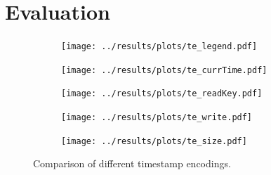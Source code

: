 \documentclass[border=2cm]{standalone}
\begin{document}
\begin{minipage}{17cm}

  \setcounter{section}{4}
  \setcounter{figure}{5}
  \setcounter{lstlisting}{2}

  \section{Evaluation}

  \begin{figure}[t]
    \centering
    \begin{subfigure}{0.5\textwidth}
      \centering
      \hspace*{0.7cm}
      \texttt{[image: ../results/plots/te\_legend.pdf]}
    \end{subfigure}

    \medskip

    \begin{subfigure}{.26\textwidth}
      \centering
      \texttt{[image: ../results/plots/te\_currTime.pdf]}
      \label{fig:te_curr}
    \end{subfigure}
    \hspace*{0.5cm}
    \begin{subfigure}{.26\textwidth}
      \centering
      \texttt{[image: ../results/plots/te\_readKey.pdf]}
      \label{fig:te_read}
    \end{subfigure}
    \par\bigskip
    \begin{subfigure}{.26\textwidth}
      \centering
      \texttt{[image: ../results/plots/te\_write.pdf]}
      \label{fig:te_write}
    \end{subfigure}
    \hspace*{0.5cm}
    \begin{subfigure}{.26\textwidth}
      \centering
      \texttt{[image: ../results/plots/te\_size.pdf]}
      \label{fig:te_size}
    \end{subfigure}
    \caption{Comparison of different timestamp encodings.}
    \label{fig:te}
  \end{figure}

  \medskip


\end{minipage}
\end{document}
